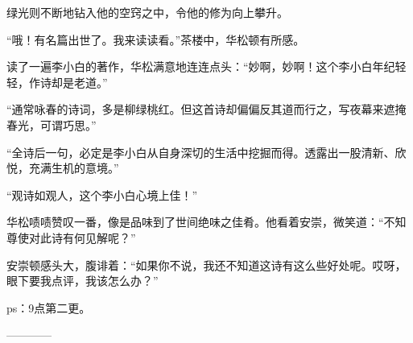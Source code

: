 \begin{this_body}
绿光则不断地钻入他的空窍之中，令他的修为向上攀升。

“哦！有名篇出世了。我来读读看。”茶楼中，华松顿有所感。

读了一遍李小白的著作，华松满意地连连点头：“妙啊，妙啊！这个李小白年纪轻轻，作诗却是老道。”

“通常咏春的诗词，多是柳绿桃红。但这首诗却偏偏反其道而行之，写夜幕来遮掩春光，可谓巧思。”

“全诗后一句，必定是李小白从自身深切的生活中挖掘而得。透露出一股清新、欣悦，充满生机的意境。”

“观诗如观人，这个李小白心境上佳！”

华松啧啧赞叹一番，像是品味到了世间绝味之佳肴。他看着安崇，微笑道：“不知尊使对此诗有何见解呢？”

安崇顿感头大，腹诽着：“如果你不说，我还不知道这诗有这么些好处呢。哎呀，眼下要我点评，我该怎么办？”

ps：9点第二更。

------------

\end{this_body}

